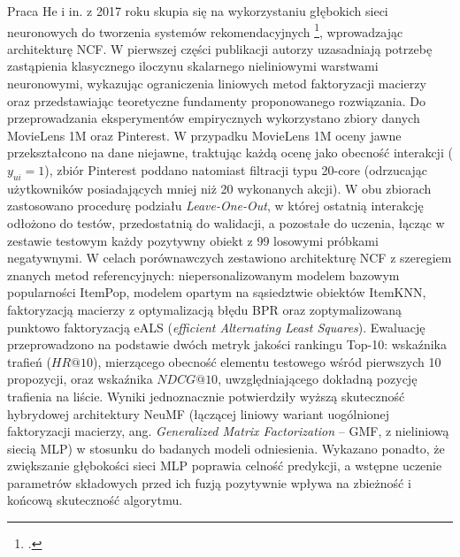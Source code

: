 Praca He i in. z 2017 roku skupia się na wykorzystaniu głębokich sieci neuronowych do tworzenia systemów rekomendacyjnych \footcite{heNeuralCollaborativeFilteringKwiecien032017}, wprowadzając architekturę NCF. W pierwszej części publikacji autorzy uzasadniają potrzebę zastąpienia klasycznego iloczynu skalarnego nieliniowymi warstwami neuronowymi, wykazując ograniczenia liniowych metod faktoryzacji macierzy oraz przedstawiając teoretyczne fundamenty proponowanego rozwiązania. Do przeprowadzania eksperymentów empirycznych wykorzystano zbiory danych MovieLens 1M oraz Pinterest. W przypadku MovieLens 1M oceny jawne przekształcono na dane niejawne, traktując każdą ocenę jako obecność interakcji ($y_{ui} = 1$), zbiór Pinterest poddano natomiast filtracji typu 20-core (odrzucając użytkowników posiadających mniej niż 20 wykonanych akcji). W obu zbiorach zastosowano procedurę podziału \textit{Leave-One-Out}, w której ostatnią interakcję odłożono do testów, przedostatnią do walidacji, a pozostałe do uczenia, łącząc w zestawie testowym każdy pozytywny obiekt z 99 losowymi próbkami negatywnymi. W celach porównawczych zestawiono architekturę NCF z szeregiem znanych metod referencyjnych: niepersonalizowanym modelem bazowym popularności ItemPop, modelem opartym na sąsiedztwie obiektów ItemKNN, faktoryzacją macierzy z optymalizacją błędu BPR oraz zoptymalizowaną punktowo faktoryzacją eALS (\foreignlanguage{english}{\textit{efficient Alternating Least Squares}}). Ewaluację przeprowadzono na podstawie dwóch metryk jakości rankingu Top-10: wskaźnika trafień ($HR@10$), mierzącego obecność elementu testowego wśród pierwszych 10 propozycji, oraz wskaźnika $NDCG@10$, uwzględniającego dokładną pozycję trafienia na liście. Wyniki jednoznacznie potwierdziły wyższą skuteczność hybrydowej architektury NeuMF (łączącej liniowy wariant uogólnionej faktoryzacji macierzy, ang. \foreignlanguage{english}{\textit{Generalized Matrix Factorization}} -- GMF, z nieliniową siecią MLP) w stosunku do badanych modeli odniesienia. Wykazano ponadto, że zwiększanie głębokości sieci MLP poprawia celność predykcji, a wstępne uczenie parametrów składowych przed ich fuzją pozytywnie wpływa na zbieżność i końcową skuteczność algorytmu.

